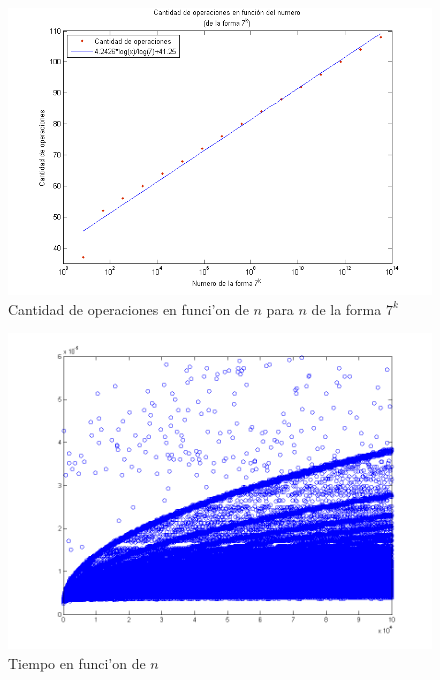 \begin{figure}[H]
\centering
\includegraphics[scale=0.8]{../../codigo/ejercicio1/benchmark/graficos/potencias_de_7/graficoPotenciasDe7.png}
\caption{Cantidad de operaciones en funci'on de $n$ para $n$ de la forma $7^k$}
\label{Ej1fig3}
\end{figure}

\begin{figure}[H]
\centering
\includegraphics[scale=0.5]{../../codigo/ejercicio1/benchmark_de_tiempo/graficos/todos_los_numeros/todosLosNumerosPuntosTiempo.png}
\caption{Tiempo en funci'on de $n$}
\label{Ej1fig4}
\end{figure}

